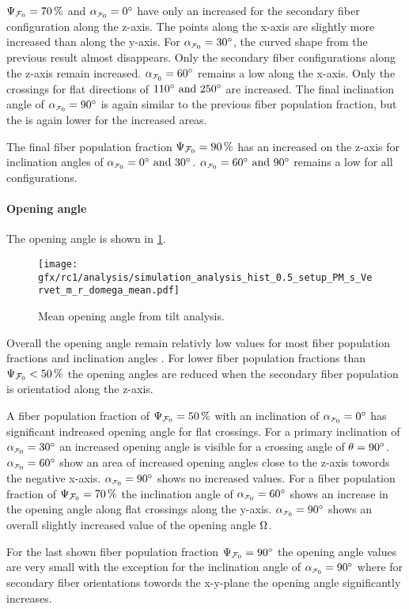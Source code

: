 \par
%
$\textnormal{$\Psi_{\textnormal{$\mathcal{F}_0$}}$}=\SI{70}{\percent}$ and $\modelInc=\SI{0}{\degree}$ have only an increased \rvalue{} for the secondary fiber configuration along the z-axis.
The points along the x-axis are slightly more increased than along the y-axis.
For $\modelInc=\SI{30}{\degree}$, the curved shape from the previous result almost disappears.
Only the secondary fiber configurations along the z-axis remain increased.
$\modelInc=\SI{60}{\degree}$ remains a low \rvalue{} along the x-axis.
Only the crossings for flat directions of $\SIlist{110;250}{\degree}$ are increased.
The final inclination angle of $\modelInc=\SI{90}{\degree}$ is again similar to the previous fiber population fraction, but the \rvalue{} is again lower for the increased areas.
\par
% 
The final fiber population fraction $\textnormal{$\Psi_{\textnormal{$\mathcal{F}_0$}}$}=\SI{90}{\percent}$ has an increased \rvalue{} on the z-axis for inclination angles of $\modelInc=\SIlist{0;30}{\degree}$.
$\modelInc=\SIlist{60;90}{\degree}$ remains a low \rvalue{} for all configurations.
% 
% 
% 
\paragraph{Opening angle \openingAngle{}}
% 
The opening angle \openingAngle{} is shown in \cref{fig:sim_ana_domega}.
\par
% 
\begin{figure}[!p]
\centering
\texttt{[image: gfx/rc1/analysis/simulation\_analysis\_hist\_0.5\_setup\_PM\_s\_Vervet\_m\_r\_domega\_mean.pdf]}
\caption{Mean opening angle \openingAngle{} from tilt analysis.}
\label{fig:sim_ana_domega}
\end{figure}
% 
Overall the opening angle \openingAngle{} remain relativly low values for most fiber population fractions \modelPsi{} and inclination angles \modelInc{}.
For lower fiber population fractions than $\textnormal{$\Psi_{\textnormal{$\mathcal{F}_0$}}$} < \SI{50}{\percent}$ the opening angles are reduced when the secondary fiber population is orientatiod along the z-axis.
\par
% 
A fiber population fraction of $\textnormal{$\Psi_{\textnormal{$\mathcal{F}_0$}}$} = \SI{50}{\percent}$ with an inclination of $\modelInc=\SI{0}{\degree}$ has significant indreased opening angle for flat crossings.
For a primary inclination of $\modelInc=\SI{30}{\degree}$ an increased opening angle is visible for a crossing angle of $\textnormal{$\theta$}=\SI{90}{\degree}$.
$\modelInc=\SI{60}{\degree}$ show an area of increased opening angles close to the z-axis towords the negative x-axis.
$\modelInc=\SI{90}{\degree}$ shows no increased values.
% 
For a fiber population fraction of $\textnormal{$\Psi_{\textnormal{$\mathcal{F}_0$}}$}=\SI{70}{\percent}$ the inclination angle of $\modelInc=\SI{60}{\degree}$ shows an increase in the opening angle along flat crossings along the y-axis.
$\modelInc=\SI{90}{\degree}$ shows an overall slightly increased value of the opening angle $\textnormal{$\Omega$}$.
\par
% 
For the last shown fiber population fraction $\textnormal{$\Psi_{\textnormal{$\mathcal{F}_0$}}$}=\SI{90}{\degree}$ the opening angle values are very small with the exception for the inclination angle of $\modelInc=\SI{90}{\degree}$ where for secondary fiber orientations towords the x-y-plane the opening angle significantly increases.
% 
% 
% 
